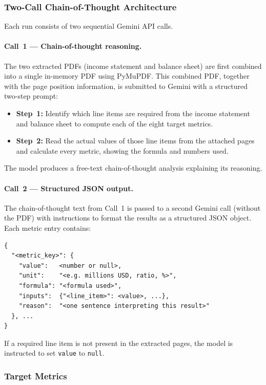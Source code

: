 \documentclass[12pt, a4paper]{article}
\begin{document}
\subsubsection{Two-Call Chain-of-Thought Architecture}

Each run consists of two sequential Gemini API calls.

\paragraph{Call~1 --- Chain-of-thought reasoning.}
The two extracted PDFs (income statement and balance sheet) are first combined
into a single in-memory PDF using PyMuPDF.  This combined PDF, together with
the page position information, is submitted to Gemini with a structured
two-step prompt:

\begin{itemize}[noitemsep]
  \item \textbf{Step~1:} Identify which line items are required from the
        income statement and balance sheet to compute each of the eight target
        metrics.
  \item \textbf{Step~2:} Read the actual values of those line items from the
        attached pages and calculate every metric, showing the formula and
        numbers used.
\end{itemize}

The model produces a free-text chain-of-thought analysis explaining its
reasoning.

\paragraph{Call~2 --- Structured JSON output.}
The chain-of-thought text from Call~1 is passed to a second Gemini call
(without the PDF) with instructions to format the results as a structured JSON
object.  Each metric entry contains:

\begin{verbatim}
{
  "<metric_key>": {
    "value":   <number or null>,
    "unit":    "<e.g. millions USD, ratio, %>",
    "formula": "<formula used>",
    "inputs":  {"<line_item>": <value>, ...},
    "reason":  "<one sentence interpreting this result>"
  }, ...
}
\end{verbatim}

If a required line item is not present in the extracted pages, the model is
instructed to set \texttt{value} to \texttt{null}.

\subsubsection{Target Metrics}
\end{document}
